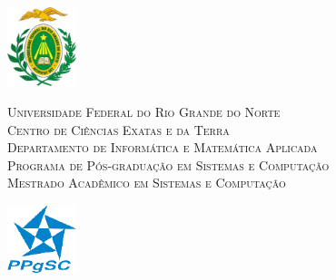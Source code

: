 

\begin{titlingpage}
	\begin{center}
		\begin{minipage}{2cm}
			\begin{center}
				\includegraphics[width=2cm]{Imagens/Brasao-UFRN.jpg}
			\end{center}
		\end{minipage}
		\begin{minipage}{11cm}
			\begin{center}

                    { \small
                    \textsc{Universidade Federal do Rio Grande do Norte}         \\
                    \textsc{Centro de Ciências Exatas e da Terra}         \\
                    \textsc{Departamento de Informática e Matemática Aplicada}  \\
                    \textsc{Programa de Pós-graduação em Sistemas e Computação}	\\
                    \textsc{Mestrado Acadêmico em Sistemas e Computação}} 
                
			
            \end{center}
		\end{minipage}
		\begin{minipage}{2cm}
			\begin{center}
				\includegraphics[width=2cm, height=2cm]{Imagens/logo-ppgsc.png}
			\end{center}
		\end{minipage}
			

\end{center}
\end{titlingpage}
